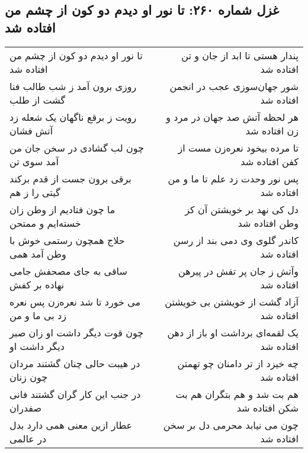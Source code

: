 \begin{center}
\section*{غزل شماره ۲۶۰: تا نور او دیدم دو کون از چشم من افتاده شد}
\label{sec:260}
\begin{longtable}{l p{0.5cm} r}
تا نور او دیدم دو کون از چشم من افتاده شد
&&
پندار هستی تا ابد از جان و تن افتاده شد
\\
روزی برون آمد ز شب طالب فنا گشت از طلب
&&
شور جهان‌سوزی عجب در انجمن افتاده شد
\\
رویت ز برقع ناگهان یک شعله زد آتش فشان
&&
هر لحظه آتش صد جهان در مرد و زن افتاده شد
\\
چون لب گشادی در سخن جان من آمد سوی تن
&&
تا مرده بیخود نعره‌زن مست از کفن افتاده شد
\\
برقی برون جست از قدم برکند گیتی را ز هم
&&
پس نور وحدت زد علم تا ما و من افتاده شد
\\
ما چون فتادیم از وطن زان خسته‌ایم و ممتحن
&&
دل کی نهد بر خویشتن آن کز وطن افتاده شد
\\
حلاج همچون رستمی خوش با وطن آمد همی
&&
کاندر گلوی وی دمی بند از رسن افتاده شد
\\
ساقی به جای مصحفش جامی نهاده بر کفش
&&
وآتش ز جان پر تفش در پیرهن افتاده شد
\\
می خورد تا شد نعره‌زن پس نعره زد بی ما و من
&&
آزاد گشت از خویشتن بی خویشتن افتاده شد
\\
چون قوت دیگر داشت او زان صبر دیگر داشت او
&&
یک لقمه‌ای برداشت او باز از دهن افتاده شد
\\
در هیبت حالی چنان گشتند مردان چون زنان
&&
چه خیزد از تر دامنان چو تهمتن افتاده شد
\\
در جنب این کار گران گشتند فانی صفدران
&&
هم بت شد و هم بتگران هم بت شکن افتاده شد
\\
عطار ازین معنی همی دارد بدل در عالمی
&&
چون می نیابد محرمی دل بر سخن افتاده شد
\\
\end{longtable}
\end{center}
